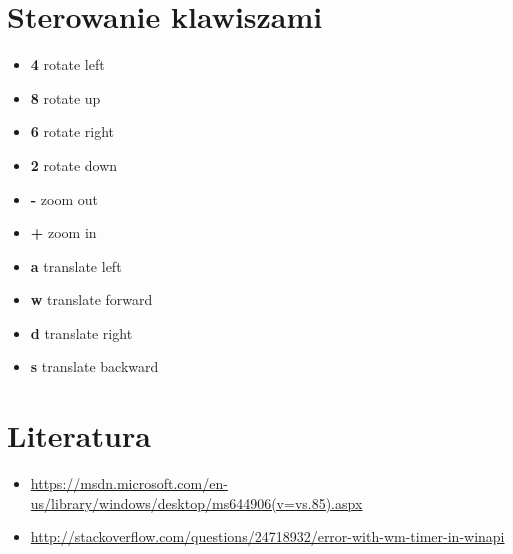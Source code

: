 \documentclass[11pt,a4paper]{article}
\begin{document}
	
	
	\newcommand{\signItem}[1]{\item[\textbf{#1}]}
	\section{Sterowanie klawiszami}
	\begin{itemize}
		\signItem{4} rotate left
		\signItem{8} rotate up
		\signItem{6} rotate right
		\signItem{2} rotate down
		\signItem{-} zoom out
		\signItem{+} zoom in
		\signItem{a} translate left
		\signItem{w} translate forward
		\signItem{d} translate right
		\signItem{s} translate	backward
	\end{itemize}
	
	\section{Literatura}
	\begin{itemize}
		\item \url{https://msdn.microsoft.com/en-us/library/windows/desktop/ms644906(v=vs.85).aspx}
		\item \url{http://stackoverflow.com/questions/24718932/error-with-wm-timer-in-winapi}
	\end{itemize}
	
\end{document}
